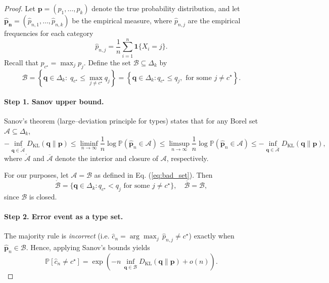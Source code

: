 \begin{proof}[Proof]
Let $\mathbf{p} = (p_1, \dots, p_k)$ denote the true probability distribution, and let $\mathbf{\hat{p}_n} = (\hat{{p}}_{n,1}, \dots, \hat{{p}}_{n,k})$ be the empirical measure, where $\hat{p}_{n,j}$ are the empirical frequencies for each category
$$
\hat p_{n,j}=\frac1n\sum_{i=1}^n\mathbf 1\{X_i=j\}.
$$
Recall that $p_{c^\star} = \max_j p_j$.
Define the set $\mathcal{B}\subseteq\Delta_k$ by
\begin{equation}\label{eq:bad_set}
\mathcal B
=\left\{\mathbf q\in\Delta_k:\;q_{c^\star}\le\max_{j \neq c^\star}q_j\right\}= \left\{ \mathbf q \in \Delta_k : q_{c^\star} \leq q_j, \mbox{ for some } j \neq c^\star\right\}.    
\end{equation}

    \paragraph{Step 1. Sanov upper bound.} 
Sanov’s theorem (large--deviation principle for types) states that for
any Borel set $\mathcal A\subseteq\Delta_k$,
$$
-\inf_{\mathbf{q}\in\mathring{\mathcal A}}D_{\mathrm{KL}}(\mathbf{q}\|\mathbf p)
\le
\liminf_{n\to\infty}\frac1n\log
\mathbb P\left(\hat{\mathbf p}_n\in\mathcal A\right)
\le
\limsup_{n\to\infty}\frac1n\log
\mathbb P\left(\hat{\mathbf p}_n\in\mathcal A\right)
\le
-\inf_{\mathbf{q}\in\overline{\mathcal A}}D_{\mathrm{KL}}(\mathbf q\|\mathbf p),
$$
where $\mathring{\mathcal A}$ and $\overline{\mathcal A}$ denote the interior and closure of $\mathcal{A}$, respectively. 

For our purposes, let $\mathcal{A} = \mathcal{B}$ as defined in Eq. (\ref{eq:bad_set}). Then
$$
\mathring{\mathcal B} = \{\mathbf q \in \Delta_k : q_{c^\star} < q_j \text{ for some } j \neq c^\star \}, 
\quad \overline{\mathcal B} = \mathcal B,
$$
since $\mathcal{B}$ is closed.

    \paragraph{Step 2. Error event as a type set.}
    The majority rule is \emph{incorrect} (i.e. $\hat{c}_n = \arg\max_j \,\hat{{p}}_{n,j}\neq c^\star$) 
    exactly when $\hat{\mathbf p}_n\in\mathcal B$. 
Hence, applying Sanov’s bounds yields
$$
\mathbb P\left[\hat{c}_n\neq c^\star\right] = 
\exp\left(-n\,\inf_{\mathbf q\in\mathcal B}D_{\mathrm{KL}}(\mathbf q\|\mathbf p)
+o(n)\right).
$$

\end{proof}

